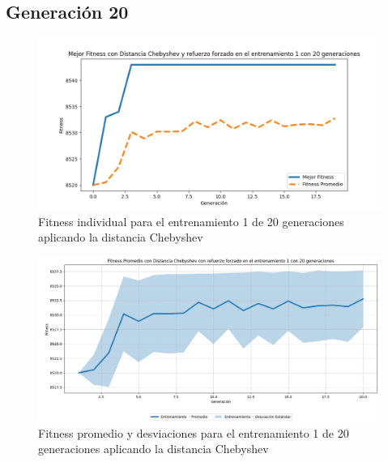 \documentclass[conference]{IEEEtran}
\begin{document}
\subsection{Generación 20}
\setcounter{figure}{0}
\renewcommand{\thefigure}{S\arabic{figure}C-C}

\begin{figure}[H]
    \centering
    \includegraphics[width=0.9 \linewidth]{Chebyshev/Fitness_individual_20Gen/Fitness_1_Cheby_20Gen.png}
    \caption{Fitness individual para el entrenamiento 1 de 20 generaciones aplicando la distancia Chebyshev}
    \label{fig:cheb_1_20}
\end{figure}
\begin{figure}[H]
    \centering
    \includegraphics[width=0.9 \linewidth]{Chebyshev/Fitness_individual_20Gen/Fitness_1_Cheby_20Gen_Sombra.png}
    \caption{Fitness promedio y desviaciones para el entrenamiento 1 de 20 generaciones aplicando la distancia Chebyshev}
    \label{fig:cheb_1_20_sombra}
\end{figure}
\end{document}
